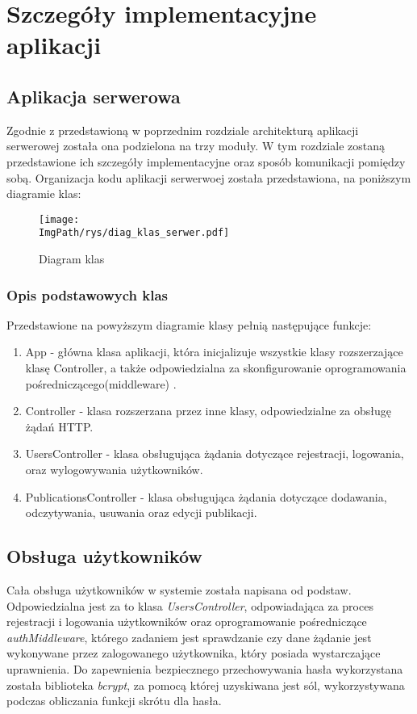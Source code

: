 \documentclass[a4paper,12pt,twoside,openany]{report}
\newcommand{\ImgPath}{.}
\begin{document}
\chapter{Szczegóły implementacyjne aplikacji}
\section{Aplikacja serwerowa}
Zgodnie z przedstawioną w poprzednim rozdziale architekturą aplikacji serwerowej została ona podzielona na trzy moduły. W tym rozdziale zostaną przedstawione ich szczegóły implementacyjne oraz sposób komunikacji pomiędzy sobą. Organizacja kodu aplikacji serwerwoej została przedstawiona, na poniższym diagramie klas:

 \begin{figure}[!htbp]
	\begin{center}
		\centering
		\texttt{[image: \\ImgPath/rys/diag\_klas\_serwer.pdf]}
	\end{center}
	\caption{Diagram klas}
	\label{diagramKlas}
\end{figure}
\subsection{Opis podstawowych klas}
Przedstawione na powyższym diagramie klasy pełnią następujące funkcje:
\begin{enumerate}
	\item App - główna klasa aplikacji, która inicjalizuje wszystkie klasy rozszerzające klasę Controller, a także odpowiedzialna za skonfigurowanie oprogramowania pośredniczącego(middleware) .
	
	\item Controller - klasa rozszerzana przez inne klasy, odpowiedzialne za obsługę żądań  HTTP.
	
	\item UsersController - klasa obsługująca żądania dotyczące rejestracji, logowania, oraz wylogowywania użytkowników.
	
	\item PublicationsController - klasa obsługująca żądania dotyczące dodawania, odczytywania, usuwania oraz edycji publikacji.
	
\end{enumerate}

\section{Obsługa użytkowników}
Cała obsługa użytkowników w systemie została napisana od podstaw. Odpowiedzialna jest za to klasa \textit{UsersController}, odpowiadająca za proces rejestracji i logowania użytkowników oraz oprogramowanie pośredniczące \textit{authMiddleware}, którego zadaniem jest sprawdzanie czy dane żądanie jest wykonywane przez zalogowanego użytkownika, który posiada wystarczające uprawnienia. Do zapewnienia bezpiecznego przechowywania hasła wykorzystana została biblioteka \textit{bcrypt}, za pomocą której uzyskiwana jest sól, wykorzystywana podczas obliczania funkcji skrótu dla hasła. 
\end{document}
